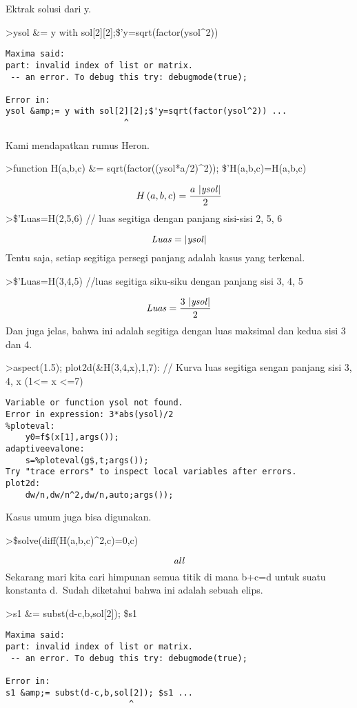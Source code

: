 \documentclass[
]{book}
\begin{document}
Ektrak solusi dari y.

\textgreater ysol \&= y with sol{[}2{]}{[}2{]};\$'y=sqrt(factor(ysol\^{}2))

\begin{verbatim}
Maxima said:
part: invalid index of list or matrix.
 -- an error. To debug this try: debugmode(true);

Error in:
ysol &amp;= y with sol[2][2];$'y=sqrt(factor(ysol^2)) ...
                        ^
\end{verbatim}

Kami mendapatkan rumus Heron.

\textgreater function H(a,b,c) \&= sqrt(factor((ysol*a/2)\^{}2)); \$'H(a,b,c)=H(a,b,c)

\[H\left(a , b , c\right)=\frac{a\,\left| {\it ysol}\right| }{2}\]\textgreater\$'Luas=H(2,5,6) // luas segitiga dengan panjang sisi-sisi 2, 5, 6

\[{\it Luas}=\left| {\it ysol}\right| \]Tentu saja, setiap segitiga persegi panjang adalah kasus yang terkenal.

\textgreater\$'Luas=H(3,4,5) //luas segitiga siku-siku dengan panjang sisi 3, 4, 5

\[{\it Luas}=\frac{3\,\left| {\it ysol}\right| }{2}\]Dan juga jelas, bahwa ini adalah segitiga dengan luas maksimal dan kedua sisi 3 dan 4.

\textgreater aspect(1.5); plot2d(\&H(3,4,x),1,7): // Kurva luas segitiga sengan panjang sisi 3, 4, x (1\textless= x \textless=7)

\begin{verbatim}
Variable or function ysol not found.
Error in expression: 3*abs(ysol)/2
%ploteval:
    y0=f$(x[1],args());
adaptiveevalone:
    s=%ploteval(g$,t;args());
Try "trace errors" to inspect local variables after errors.
plot2d:
    dw/n,dw/n^2,dw/n,auto;args());
\end{verbatim}

Kasus umum juga bisa digunakan.

\textgreater\$solve(diff(H(a,b,c)\^{}2,c)=0,c)

\[{\it all}\]Sekarang mari kita cari himpunan semua titik di mana b+c=d untuk suatu konstanta d.~Sudah diketahui bahwa ini adalah sebuah elips.

\textgreater s1 \&= subst(d-c,b,sol{[}2{]}); \$s1

\begin{verbatim}
Maxima said:
part: invalid index of list or matrix.
 -- an error. To debug this try: debugmode(true);

Error in:
s1 &amp;= subst(d-c,b,sol[2]); $s1 ...
                         ^
\end{verbatim}
\end{document}
